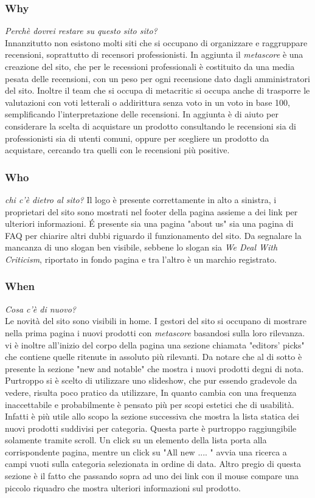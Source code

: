 \documentclass[12pt]{article}
\begin{document}
\subsubsection{Why}
\textit{Perchè dovrei restare su questo sito sito?}\\
Innanzitutto non esistono molti siti che si occupano di organizzare e raggruppare recensioni, soprattutto di recensori professionisti. In aggiunta il \textit{metascore} è una creazione del sito, che per le recessioni professionali è costituito da una media pesata delle recensioni, con un peso per ogni recensione dato dagli amministratori del sito. Inoltre il team che si occupa di metacritic si occupa anche di trasporre le valutazioni con voti letterali o addirittura senza voto in un voto in base 100, semplificando l'interpretazione delle recensioni. In aggiunta è di aiuto per considerare la scelta di acquistare un prodotto consultando le recensioni sia di professionisti sia di utenti comuni, oppure per scegliere un prodotto da acquistare, cercando tra quelli con le recensioni più positive.
\subsubsection{Who}
\textit{chi c'è dietro al sito?}
Il logo è presente correttamente in alto a sinistra, i proprietari del sito sono mostrati nel footer della pagina assieme a dei link per ulteriori informazioni. \'E presente sia una pagina "about us" sia una pagina di FAQ per chiarire altri dubbi riguardo il funzionamento del sito. Da segnalare la mancanza di uno slogan ben visibile, sebbene lo slogan sia \textit{We Deal With Criticism}, riportato in fondo pagina e tra l'altro è un marchio registrato.
\subsubsection{When}
\textit{Cosa c'è di nuovo?}\\
Le novità del sito sono visibili in home. I gestori del sito si occupano di mostrare nella prima pagina i nuovi prodotti con \textit{metascore} basandosi sulla loro rilevanza. vi è inoltre all'inizio del corpo della pagina una sezione chiamata "editors' picks" che contiene quelle ritenute in assoluto più rilevanti. Da notare che al di sotto è presente la sezione "new and notable" che mostra i nuovi prodotti degni di nota. Purtroppo si è scelto di utilizzare uno slideshow, che pur essendo gradevole da vedere, risulta poco pratico da utilizzare, In quanto cambia con una frequenza inaccettabile  e probabilmente è pensato più per scopi estetici che di usabilità. Infatti è più utile allo scopo la sezione successiva che mostra la lista statica dei nuovi prodotti suddivisi per categoria. Questa parte è purtroppo raggiungibile solamente tramite scroll. Un click su un elemento della lista porta alla corrispondente pagina, mentre un click su "All new .... " avvia una ricerca a campi vuoti sulla categoria selezionata in ordine di data. Altro pregio di questa sezione è il fatto che passando sopra ad uno dei link con il mouse compare una piccolo riquadro che mostra ulteriori informazioni sul prodotto.
\end{document}
